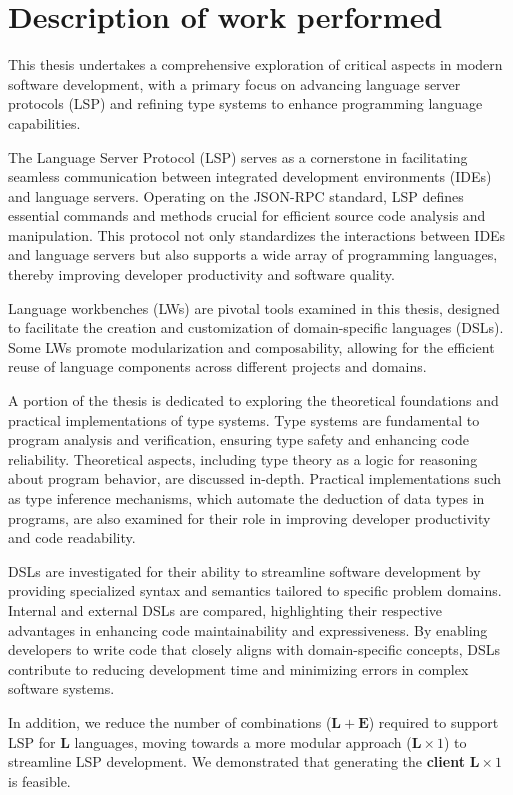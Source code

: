 \documentclass{adapt-lab}
\begin{document}
\section{Description of work performed}

This thesis undertakes a comprehensive exploration of critical aspects in modern software development, with a primary focus on advancing language server protocols (LSP) and refining type systems to enhance programming language capabilities.

The Language Server Protocol (LSP) serves as a cornerstone in facilitating seamless communication between integrated development environments (IDEs) and language servers. Operating on the JSON-RPC standard, LSP defines essential commands and methods crucial for efficient source code analysis and manipulation. This protocol not only standardizes the interactions between IDEs and language servers but also supports a wide array of programming languages, thereby improving developer productivity and software quality.

Language workbenches (LWs) are pivotal tools examined in this thesis, designed to facilitate the creation and customization of domain-specific languages (DSLs). Some LWs promote modularization and composability, allowing for the efficient reuse of language components across different projects and domains.

A portion of the thesis is dedicated to exploring the theoretical foundations and practical implementations of type systems. Type systems are fundamental to program analysis and verification, ensuring type safety and enhancing code reliability. Theoretical aspects, including type theory as a logic for reasoning about program behavior, are discussed in-depth. Practical implementations such as type inference mechanisms, which automate the deduction of data types in programs, are also examined for their role in improving developer productivity and code readability.

DSLs are investigated for their ability to streamline software development by providing specialized syntax and semantics tailored to specific problem domains. Internal and external DSLs are compared, highlighting their respective advantages in enhancing code maintainability and expressiveness. By enabling developers to write code that closely aligns with domain-specific concepts, DSLs contribute to reducing development time and minimizing errors in complex software systems.

In addition, we reduce the number of combinations ($\mathbf{L} + \mathbf{E}$) required to support LSP for $\mathbf{L}$ languages, moving towards a more modular approach ($\mathbf{L} \times 1$) to streamline LSP development. We demonstrated that generating the \textbf{client} $\mathbf{L} \times 1$ is feasible.
\end{document}
